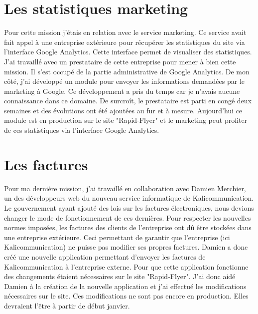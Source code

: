 \section{Les statistiques marketing}
Pour cette mission j'étais en relation avec le service marketing. Ce service avait fait appel à une entreprise extérieure pour récupérer les statistiques du site via l'interface Google Analytics. Cette interface permet de visualiser des statistiques.\newline
J'ai travaillé avec un prestataire de cette entreprise pour mener à bien cette mission. Il s'est occupé de la partie administrative de Google Analytics. De mon côté, j'ai développé un module pour envoyer les informations demandées par le marketing à Google. Ce développement a pris du temps car je n'avais aucune connaissance dans ce domaine. De surcroît, le prestataire est parti en congé deux semaines et des évolutions ont été ajoutées au fur et à mesure. Aujourd'hui ce module est en production sur le site "Rapid-Flyer" et le marketing peut profiter de ces statistiques via l'interface Google Analytics.

\section{Les factures}
Pour ma dernière mission, j'ai travaillé en collaboration avec Damien Merchier, un des développeurs web du nouveau service informatique de Kalicommunication.\newline
Le gouvernement ayant ajouté des lois sur les factures électroniques, nous devions changer le mode de fonctionnement de ces dernières. Pour respecter les nouvelles normes imposées, les factures des clients de l'entreprise ont dû être stockées dans une entreprise extérieure. Ceci permettant de garantir que l'entreprise (ici Kalicommunication) ne puisse pas modifier ses propres factures.\newline
Damien a donc créé une nouvelle application permettant d'envoyer les factures de Kalicommunication à l'entreprise externe. Pour que cette application fonctionne des changements étaient nécessaires sur le site "Rapid-Flyer". J'ai donc aidé Damien à la création de la nouvelle application et j'ai effectué les modifications nécessaires sur le site. Ces modifications ne sont pas encore en production. Elles devraient l'être à partir de début janvier.